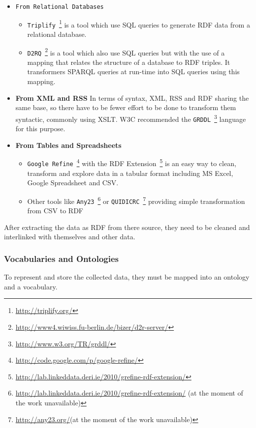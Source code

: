 {\begin{itemize}
	\item \texttt{From Relational Databases}
	\begin{itemize}
		\item \texttt{Triplify}~\footnote{\url{http://triplify.org/}} is a tool which use SQL queries to generate RDF data from a relational database.
		\item \texttt{D2RQ}~\footnote{\url{http://www4.wiwiss.fu-berlin.de/bizer/d2r-server/}} is a tool which also use SQL queries but with the use of a mapping that relates the structure of a database to RDF triples. It transformers SPARQL queries at run-time into SQL queries using this mapping.
	\end{itemize}
	\item \textbf{From XML and RSS}\newline
	In terms of syntax, XML, RSS and RDF sharing the same base, so there have to be fewer effort to be done to transform them syntactic, commonly using XSLT. W3C recommended the \texttt{GRDDL}~\footnote{\url{http://www.w3.org/TR/grddl/}} language for this purpose.
	\item \textbf{From Tables and Spreadsheets}
	\begin{itemize}
		\item \texttt{Google Refine}~\footnote{\url{http://code.google.com/p/google-refine/}} with the RDF Extension~\footnote{\url{http://lab.linkeddata.deri.ie/2010/grefine-rdf-extension/}} is an easy way to clean, transform and explore data in a tabular format including MS Excel, Google Spreadsheet and CSV.
		\item Other tools like \texttt{Any23}~\footnote{\url{http://lab.linkeddata.deri.ie/2010/grefine-rdf-extension/} (at the moment of the work unavailable)} or \texttt{QUIDICRC}~\footnote{\url{http://any23.org/}(at the moment of the work unavailable)} providing simple transformation from CSV to RDF
	\end{itemize}
\end{itemize}

After extracting the data as RDF from there source, they need to be cleaned and interlinked with themselves and other data.

\subsubsection{Vocabularies and Ontologies}\label{subsubsec:ontologies}
To represent and store the collected data, they must be mapped into an ontology and a vocabulary.

}
